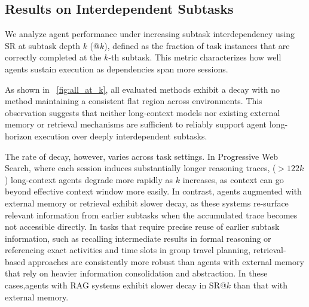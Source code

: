 \subsection{Results on Interdependent Subtasks}  
We analyze agent performance under increasing subtask interdependency using SR at subtask depth $k$ (@$k$), defined as the fraction of task instances that are correctly completed at the $k$-th subtask. This metric characterizes how well agents sustain execution as dependencies span more sessions. 

As shown in ~\cref{fig:all_at_k}, all evaluated methods exhibit a decay with no method maintaining a consistent flat region across environments. This observation suggests that neither long-context models nor existing external memory or retrieval mechanisms are sufficient to reliably support agent long-horizon execution over deeply interdependent subtasks.

The rate of decay, however, varies across task settings. In Progressive Web Search, where each session induces substantially longer reasoning traces, ($>122k$) long-context agents degrade more rapidly as $k$ increases, as context can go beyond effective context window more easily.
In contrast, agents augmented with external memory or retrieval exhibit slower decay, as these systems re-surface relevant information from earlier subtasks when the accumulated trace becomes not accessible directly.
In tasks that require precise reuse of earlier subtask information, such as recalling intermediate results in formal reasoning or referencing exact activities and time slots in group travel planning, retrieval-based approaches are consistently more robust than agents with external memory that rely on heavier information consolidation and abstraction. In these cases,agents with RAG systems exhibit slower decay in SR@$k$ than that with external memory.






